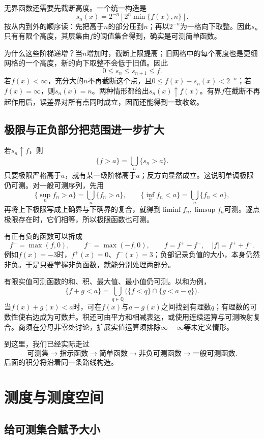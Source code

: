 无界函数还需要先截断高度。一个统一构造是
\[
 s_n(x)=2^{-n}\left\lfloor2^n\min\{f(x),n\}\right\rfloor.
\]
按从内到外的顺序读：先把高于$n$的部分压到$n$；再以$2^{-n}$为一格向下取整。因此$s_n$只有有限个高度，其层集由$f$的阈值集合得到，确实是可测简单函数。

为什么这些阶梯递增？当$n$增加时，截断上限提高；旧网格中的每个高度也是更细网格的一个高度，新的向下取整不会低于旧值。因此
\[
 0\leq s_n\leq s_{n+1}\leq f.
\]
若$f(x)<\infty$，充分大的$n$不再截断这个点，且$0\leq f(x)-s_n(x)<2^{-n}$；若$f(x)=\infty$，则$s_n(x)=n$。两种情形都给出$s_n(x)\uparrow f(x)$。有界$f$在截断不再起作用后，误差界对所有点同时成立，因而还能得到一致收敛。

\subsection{极限与正负部分把范围进一步扩大}

若$s_n\uparrow f$，则
\[
 \{f>a\}=\bigcup_n\{s_n>a\}.
\]
只要极限严格高于$a$，就有某一级阶梯高于$a$；反方向显然成立。这说明单调极限仍可测。对一般可测序列，先用
\[
 \{\sup_n f_n>a\}=\bigcup_n\{f_n>a\},\qquad
 \{\inf_n f_n<a\}=\bigcup_n\{f_n<a\},
\]
再将上下极限写成上确界与下确界的复合，就得到$\liminf f_n,\limsup f_n$可测。逐点极限存在时，它们相等，所以极限函数也可测。

有正有负的函数可以拆成
\[
 f^+=\max(f,0),\qquad f^-=\max(-f,0),\qquad
 f=f^+-f^-,\quad |f|=f^++f^-.
\]
例如$f(x)=-3$时，$f^+(x)=0$、$f^-(x)=3$；负部记录负值的大小，本身仍然非负。于是只要掌握非负函数，就能分别处理两部分。

有限实值可测函数的和、积、最大值、最小值仍可测。以和为例，
\[
 \{f+g<a\}
 =\bigcup_{q\in\mathbb Q}\bigl(\{f<q\}\cap\{g<a-q\}\bigr).
\]
当$f(x)+g(x)<a$时，可在$f(x)$与$a-g(x)$之间找到有理数$q$；有理数的可数性使右边成为可数并。积还可由平方和相减表达，或使用连续运算与可测映射复合。商须在分母非零处讨论，扩展实值运算须排除$\infty-\infty$等未定义情形。

到这里，我们已经实际走过
\[
 \text{可测集}\longrightarrow\text{指示函数}
 \longrightarrow\text{简单函数}
 \longrightarrow\text{非负可测函数}
 \longrightarrow\text{一般可测函数}.
\]
后面的积分将沿着同一条路线构造。

\section{测度与测度空间}

\subsection{给可测集合赋予大小}

